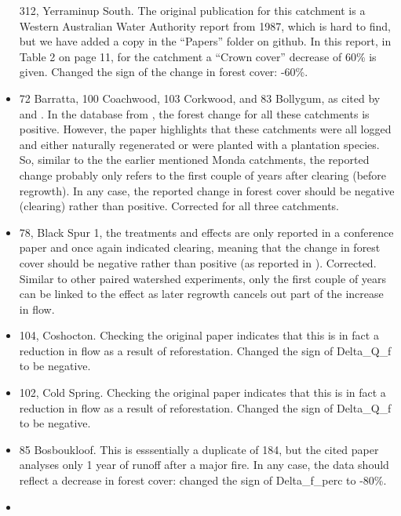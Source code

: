 \documentclass[]{elsarticle} %
\begin{document}
\begin{itemize}
  312, Yerraminup South. The original publication for this catchment is a Western Australian Water Authority report from 1987, which is hard to find, but we have added a copy in the ``Papers'' folder on github. In this report, in Table 2 on page 11, for the catchment a ``Crown cover'' decrease of 60\% is given. Changed the sign of the change in forest cover: -60\%.\\
\item
  72 Barratta, 100 Coachwood, 103 Corkwood, and 83 Bollygum, as cited by \citet{cornish1993} and \citet{cornish2001}. In the database from \citet{zhang2017}, the forest change for all these catchments is positive. However, the paper highlights that these catchments were all logged and either naturally regenerated or were planted with a plantation species. So, similar to the the earlier mentioned Monda catchments, the reported change probably only refers to the first couple of years after clearing (before regrowth). In any case, the reported change in forest cover should be negative (clearing) rather than positive. Corrected for all three catchments.\\
\item
  78, Black Spur 1, the treatments and effects are only reported in a conference paper \citep{jayasuriya1988} and once again indicated clearing, meaning that the change in forest cover should be negative rather than positive (as reported in \citet{zhang2017}). Corrected. Similar to other paired watershed experiments, only the first couple of years can be linked to the effect as later regrowth cancels out part of the increase in flow.\\
\item
  104, Coshocton. Checking the original paper indicates that this is in fact a reduction in flow as a result of reforestation. Changed the sign of Delta\_Q\_f to be negative.\\
\item
  102, Cold Spring. Checking the original paper \citep{schneider1961} indicates that this is in fact a reduction in flow as a result of reforestation. Changed the sign of Delta\_Q\_f to be negative.\\
\item
  85 Bosboukloof. This is esssentially a duplicate of 184, but the cited paper analyses only 1 year of runoff after a major fire. In any case, the data should reflect a decrease in forest cover: changed the sign of Delta\_f\_perc to -80\%.\\
\item

\end{itemize}
\end{document}

